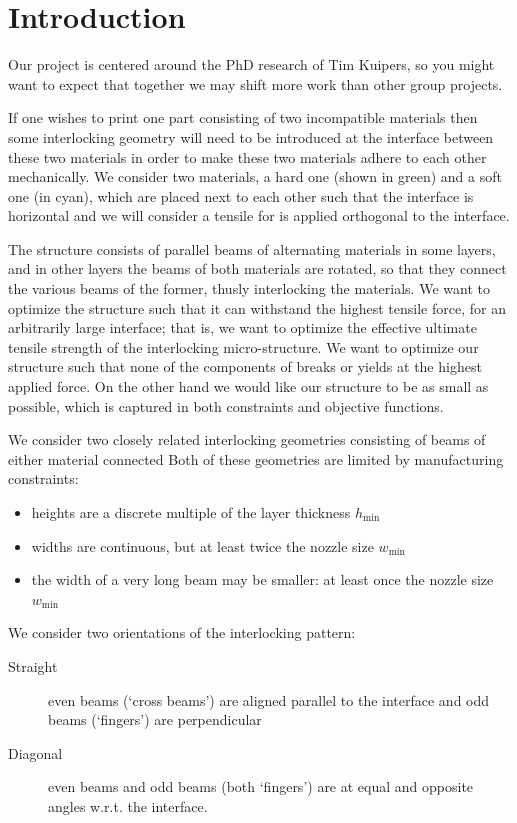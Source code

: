 \section{Introduction}
Our project is centered around the PhD research of Tim Kuipers, so you might want to expect that together we may shift more work than other group projects.

\medskip

If one wishes to print one part consisting of two incompatible materials then some interlocking geometry will need to be introduced at the interface between these two materials in order to make these two materials adhere to each other mechanically.
We consider two materials, a hard one (shown in green) and a soft one (in cyan), which are placed next to each other such that the interface is horizontal
and we will consider a tensile for is applied orthogonal to the interface.

The structure consists of parallel beams of alternating materials in some layers, and in other layers the beams of both materials are rotated, so that they connect the various beams of the former, thusly interlocking the materials.
We want to optimize the structure such that it can withstand the highest tensile force, for an arbitrarily large interface;
that is, we want to optimize the effective ultimate tensile strength of the interlocking micro-structure.
We want to optimize our structure such that none of the components of breaks or yields at the highest applied force.
On the other hand we would like our structure to be as small as possible, which is captured in both constraints and objective functions.

We consider two closely related interlocking geometries consisting of beams of either material connected 
Both of these geometries are limited by manufacturing constraints:
\begin{itemize}
	\item heights are a discrete multiple of the layer thickness $h_\text{min}$
	\item widths are continuous, but at least twice the nozzle size $w_\text{min}$
	\item the width of a very long beam may be smaller: at least once the nozzle size $w_\text{min}$
\end{itemize}


We consider two orientations of the interlocking pattern:
\begin{description}
	\item[Straight] even beams (`cross beams') are aligned parallel to the interface and odd beams (`fingers') are perpendicular
	\item[Diagonal] even beams and odd beams (both `fingers') are at equal and opposite angles w.r.t. the interface.
\end{description}






